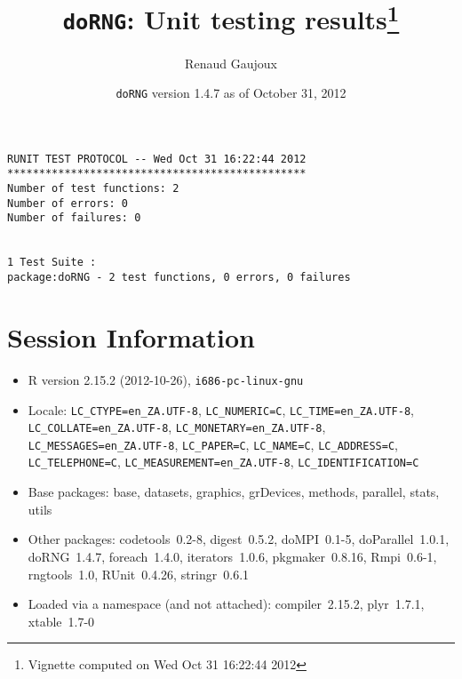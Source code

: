 \documentclass[10pt]{article}
\author{Renaud Gaujoux}
\title{\texttt{doRNG}: Unit testing results\footnote{Vignette computed  on Wed Oct 31 16:22:44 2012}}
\date{\texttt{doRNG} version 1.4.7 as of October 31, 2012}
\begin{document}
\maketitle

\begin{verbatim}
RUNIT TEST PROTOCOL -- Wed Oct 31 16:22:44 2012 
*********************************************** 
Number of test functions: 2 
Number of errors: 0 
Number of failures: 0 

 
1 Test Suite : 
package:doRNG - 2 test functions, 0 errors, 0 failures
\end{verbatim}

\section*{Session Information}
\begin{itemize}\raggedright
  \item R version 2.15.2 (2012-10-26), \verb|i686-pc-linux-gnu|
  \item Locale: \verb|LC_CTYPE=en_ZA.UTF-8|, \verb|LC_NUMERIC=C|, \verb|LC_TIME=en_ZA.UTF-8|, \verb|LC_COLLATE=en_ZA.UTF-8|, \verb|LC_MONETARY=en_ZA.UTF-8|, \verb|LC_MESSAGES=en_ZA.UTF-8|, \verb|LC_PAPER=C|, \verb|LC_NAME=C|, \verb|LC_ADDRESS=C|, \verb|LC_TELEPHONE=C|, \verb|LC_MEASUREMENT=en_ZA.UTF-8|, \verb|LC_IDENTIFICATION=C|
  \item Base packages: base, datasets, graphics, grDevices, methods,
    parallel, stats, utils
  \item Other packages: codetools~0.2-8, digest~0.5.2, doMPI~0.1-5,
    doParallel~1.0.1, doRNG~1.4.7, foreach~1.4.0, iterators~1.0.6,
    pkgmaker~0.8.16, Rmpi~0.6-1, rngtools~1.0, RUnit~0.4.26,
    stringr~0.6.1
  \item Loaded via a namespace (and not attached): compiler~2.15.2,
    plyr~1.7.1, xtable~1.7-0
\end{itemize}
\end{document}
